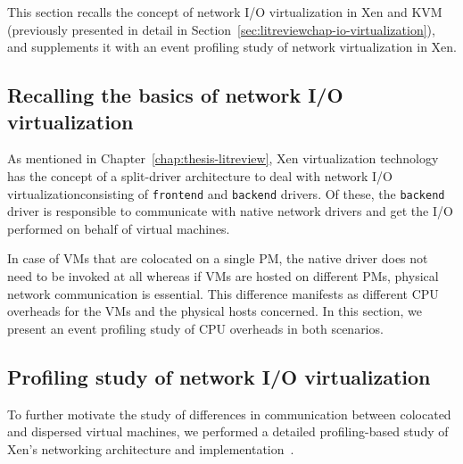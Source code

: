 This section recalls the concept of network I/O
virtualization in Xen and KVM 
(previously presented in detail in
Section~\ref{sec:litreviewchap-io-virtualization}), and supplements it
with an event profiling study of network virtualization in Xen.

\subsection{Recalling the basics of network I/O virtualization}
As mentioned in Chapter~\ref{chap:thesis-litreview}, Xen
virtualization technology has the concept of a split-driver
architecture to deal with network I/O virtualization\textemdash{}consisting of
\texttt{frontend} and \texttt{backend} drivers. Of these, the 
\texttt{backend} driver is responsible to communicate with 
native network drivers and get the I/O performed on behalf of 
virtual machines. 

In case of VMs that are colocated on a single PM, the native driver 
does not need to be invoked at all whereas
if VMs are hosted on different PMs, physical network
communication is essential. This difference manifests as different
CPU overheads for the VMs and the physical hosts 
concerned. In this section, 
we present an event profiling study of CPU overheads in both scenarios.

\subsection{Profiling study of network I/O virtualization}
To further motivate the study of differences in communication between
colocated and dispersed virtual machines, we performed a detailed 
profiling-based study of Xen's 
networking architecture and 
implementation~\cite{xen-internals, xen-networking, linux-networking}. 


